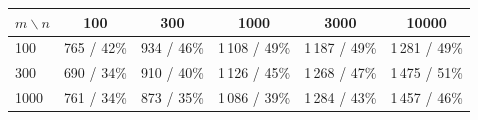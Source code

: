 \begin{tabular}{lccccc}
\toprule
$m\backslash n$ & 100 & 300 & 1000 & 3000 & 10000 \\
\midrule
100 & 765 / 42\% & 934 / 46\% & 1\,108 / 49\% & 1\,187 / 49\% & 1\,281 / 49\% \\
300 & 690 / 34\% & 910 / 40\% & 1\,126 / 45\% & 1\,268 / 47\% & 1\,475 / 51\% \\
1000 & 761 / 34\% & 873 / 35\% & 1\,086 / 39\% & 1\,284 / 43\% & 1\,457 / 46\% \\
\bottomrule
\end{tabular}